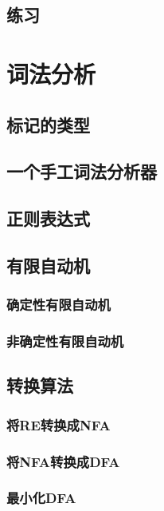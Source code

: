 \documentclass[cn,11pt,chinese]{elegantbook}
\begin{document}
\section{练习}

\chapter{词法分析}

\section{标记的类型}

\section{一个手工词法分析器}

\section{正则表达式}

\section{有限自动机}

\subsection{确定性有限自动机}

\subsection{非确定性有限自动机}

\section{转换算法}

\subsection{将RE转换成NFA}

\subsection{将NFA转换成DFA}

\subsection{最小化DFA}
\end{document}
